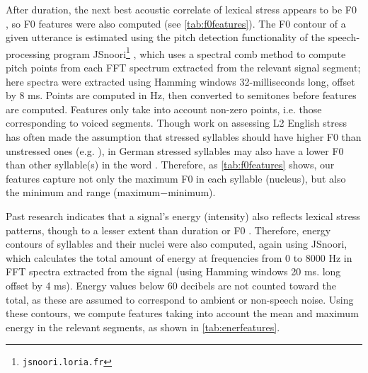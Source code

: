 \documentclass[a4paper]{article}
\begin{document}
	   After duration, the next best acoustic correlate of lexical stress appears to be F0 \cite{Dogil1999}, so F0 features were also computed (see \cref{tab:f0features}).
	    The F0 contour of a given utterance is estimated using the pitch detection functionality of the speech-processing program JSnoori\footnote{\texttt{jsnoori.loria.fr}} \cite{DiMartino1999}, which uses a spectral comb method to compute pitch points from each FFT spectrum extracted from the relevant signal segment; here spectra were extracted using Hamming windows 32-milliseconds long, offset by 8 ms. Points are computed in Hz, then converted to semitones before features are computed. Features only take into account non-zero points, i.e. those corresponding to voiced segments.
	    Though work on assessing L2 English stress has often made the assumption that stressed syllables should have higher F0 than unstressed ones (e.g. \cite{Bonneau2011}), in German stressed syllables may also have a lower F0 than other syllable(s) in the word \cite[p.~267]{Cutler2005}. Therefore, as \cref{tab:f0features} shows, our features capture not only the maximum F0 in each syllable (nucleus), but also the minimum and range (maximum$-$minimum).
	    
	    Past research indicates that a signal's energy (intensity) also reflects lexical stress patterns, though to a lesser extent than duration or F0 \cite{Dogil1999,Cutler2005}.
	   Therefore, energy contours of syllables and their nuclei were also computed, again using JSnoori, which calculates the total amount of energy at frequencies from 0 to 8000 Hz in FFT spectra extracted from the signal (using Hamming windows 20 ms. long offset by 4 ms). Energy values below 60 decibels are not counted toward the total, as these are assumed to correspond to ambient or non-speech noise. Using these contours, we compute features taking into account the mean and maximum energy in the relevant segments, as shown in \cref{tab:enerfeatures}.
	    
\end{document}
